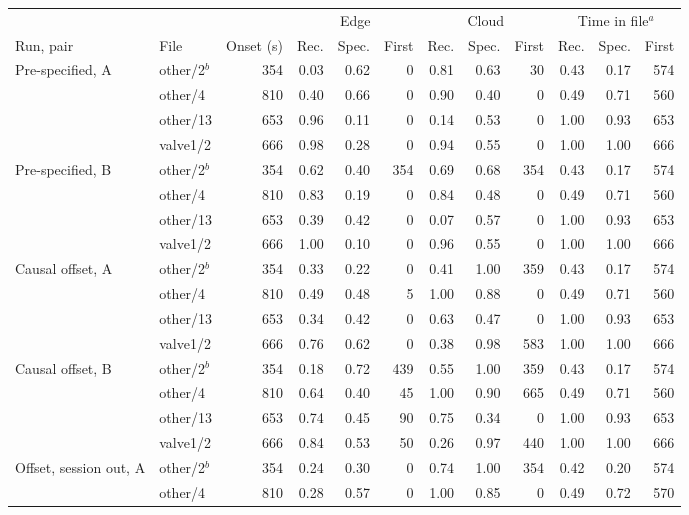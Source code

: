 \begin{tabular}{@{}l l r rrr rrr rrr@{}}
\toprule
& & & \multicolumn{3}{c}{Edge} & \multicolumn{3}{c}{Cloud} & \multicolumn{3}{c}{Time in file$^{a}$} \\
\cmidrule(lr){4-6}\cmidrule(lr){7-9}\cmidrule(l){10-12}
Run, pair & File & Onset (s) & Rec. & Spec. & First & Rec. & Spec. & First & Rec. & Spec. & First \\
\midrule
Pre-specified, A & other/2$^{b}$ & 354 & 0.03 & 0.62 & 0 & 0.81 & 0.63 & 30 & 0.43 & 0.17 & 574 \\
 & other/4 & 810 & 0.40 & 0.66 & 0 & 0.90 & 0.40 & 0 & 0.49 & 0.71 & 560 \\
 & other/13 & 653 & 0.96 & 0.11 & 0 & 0.14 & 0.53 & 0 & 1.00 & 0.93 & 653 \\
 & valve1/2 & 666 & 0.98 & 0.28 & 0 & 0.94 & 0.55 & 0 & 1.00 & 1.00 & 666 \\
Pre-specified, B & other/2$^{b}$ & 354 & 0.62 & 0.40 & 354 & 0.69 & 0.68 & 354 & 0.43 & 0.17 & 574 \\
 & other/4 & 810 & 0.83 & 0.19 & 0 & 0.84 & 0.48 & 0 & 0.49 & 0.71 & 560 \\
 & other/13 & 653 & 0.39 & 0.42 & 0 & 0.07 & 0.57 & 0 & 1.00 & 0.93 & 653 \\
 & valve1/2 & 666 & 1.00 & 0.10 & 0 & 0.96 & 0.55 & 0 & 1.00 & 1.00 & 666 \\
Causal offset, A & other/2$^{b}$ & 354 & 0.33 & 0.22 & 0 & 0.41 & 1.00 & 359 & 0.43 & 0.17 & 574 \\
 & other/4 & 810 & 0.49 & 0.48 & 5 & 1.00 & 0.88 & 0 & 0.49 & 0.71 & 560 \\
 & other/13 & 653 & 0.34 & 0.42 & 0 & 0.63 & 0.47 & 0 & 1.00 & 0.93 & 653 \\
 & valve1/2 & 666 & 0.76 & 0.62 & 0 & 0.38 & 0.98 & 583 & 1.00 & 1.00 & 666 \\
Causal offset, B & other/2$^{b}$ & 354 & 0.18 & 0.72 & 439 & 0.55 & 1.00 & 359 & 0.43 & 0.17 & 574 \\
 & other/4 & 810 & 0.64 & 0.40 & 45 & 1.00 & 0.90 & 665 & 0.49 & 0.71 & 560 \\
 & other/13 & 653 & 0.74 & 0.45 & 90 & 0.75 & 0.34 & 0 & 1.00 & 0.93 & 653 \\
 & valve1/2 & 666 & 0.84 & 0.53 & 50 & 0.26 & 0.97 & 440 & 1.00 & 1.00 & 666 \\
Offset, session out, A & other/2$^{b}$ & 354 & 0.24 & 0.30 & 0 & 0.74 & 1.00 & 354 & 0.42 & 0.20 & 574 \\
 & other/4 & 810 & 0.28 & 0.57 & 0 & 1.00 & 0.85 & 0 & 0.49 & 0.72 & 570 \\

\end{tabular}
